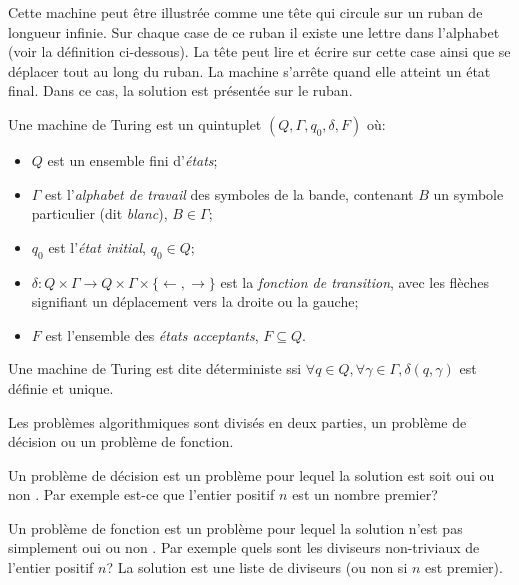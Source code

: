 \documentclass[../main.tex]{subfiles}
\begin{document}
Cette machine peut être illustrée comme une tête qui circule sur un ruban de longueur infinie. Sur chaque case de ce ruban il existe une lettre dans l'alphabet (voir la définition ci-dessous). La tête peut lire et écrire sur cette case ainsi que se déplacer tout au long du ruban. La machine s'arrête quand elle atteint un état final. Dans ce cas, la solution est présentée sur le ruban.

\begin{definition}
Une machine de Turing est un quintuplet $(Q, \Gamma, q_0, \delta, F)$ où:
\begin{itemize}
\item $Q$ est un ensemble fini d'\emph{états};
\item $\Gamma$ est l'\emph{alphabet de travail} des symboles de la bande, contenant $B$ un symbole particulier (dit \emph{blanc}), $B \in \Gamma$;
\item $q_0$ est l'\emph{état initial}, $q_0 \in Q$;
\item $\delta : Q \times \Gamma \rightarrow Q \times \Gamma \times \{\leftarrow, \rightarrow \}$ est la \emph{fonction de transition}, avec les flèches signifiant un déplacement vers la droite ou la gauche;
\item $F$ est l'ensemble des \emph{états acceptants}, $F \subseteq Q$.
\end{itemize}
Une machine de Turing est dite déterministe ssi $\forall q \in Q, \forall \gamma \in \Gamma, \delta (q, \gamma)$ est définie et unique.
\end{definition}

Les problèmes algorithmiques sont divisés en deux parties, un problème de décision ou un problème de fonction.

\begin{definition}
Un problème de décision est un problème pour lequel la solution est soit \og oui \fg{} ou \og non \fg{}. Par exemple est-ce que l'entier positif $n$ est un nombre premier?
\end{definition}

\begin{definition}
Un problème de fonction est un problème pour lequel la solution n'est pas simplement \og oui \fg{} ou \og non \fg{}. Par exemple quels sont les diviseurs non-triviaux de l'entier positif $n$? La solution est une liste de diviseurs (ou non si $n$ est premier).
\end{definition}
\end{document}
